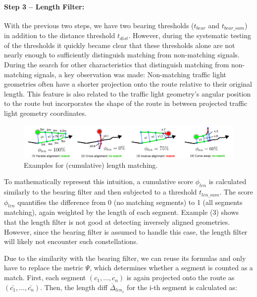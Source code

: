 \paragraph{Step 3 -- Length Filter:} With the previous two steps, we have two bearing thresholds ($t_{bear}$ and $t_{bear\_sum}$) in addition to the distance threshold $t_{dist}$. However, during the systematic testing of the thresholds it quickly became clear that these thresholds alone are not nearly enough to sufficiently distinguish matching from non-matching signals. During the search for other characteristics that distinguish matching from non-matching signals, a key observation was made: Non-matching traffic light geometries often have a shorter projection onto the route relative to their original length. This feature is also related to the traffic light geometry's angular position to the route but incorporates the shape of the route in between projected traffic light geometry coordinates.

\begin{figure}[htbp]
\centering
\includegraphics[width=\linewidth]{images/sg-selection-length-filter-sum.pdf}
\caption{Examples for (cumulative) length matching.}
\label{fig:sg-selection-length-filter-sum}
\end{figure}

To mathematically represent this intuition, a cumulative score $\phi_{len}$ is calculated similarly to the bearing filter and then subjected to a threshold $t_{len\_sum}$. The score $\phi_{len}$ quantifies the difference from 0 (no matching segments) to 1 (all segments matching), again weighted by the length of each segment. Example (3) shows that the length filter is not good at detecting inversely aligned geometries. However, since the bearing filter is assumed to handle this case, the length filter will likely not encounter such constellations.

Due to the similarity with the bearing filter, we can reuse its formulas and only have to replace the metric $\Psi$, which determines whether a segment is counted as a match. First, each segment $(c_1, \dots, c_n)$ is again projected onto the route as $(\bar{c_1}, \dots, \bar{c_n})$. Then, the length diff $\bar{\Delta}_{len_1}$ for the i-th segment is calculated as:


